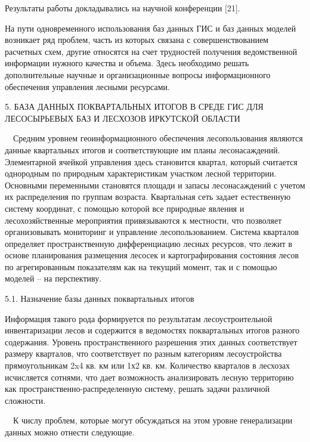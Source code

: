 \documentclass{report}
\begin{document}
Результаты работы докладывались на научной конференции [21].

На пути одновременного использования баз данных ГИС и баз данных моделей возникает ряд проблем, часть из которых связана
с совершенствованием расчетных схем, другие относятся на счет трудностей получения ведомственной информации нужного
качества и объема. Здесь необходимо решать дополнительные научные и организационные вопросы информационного обеспечения
управления лесными ресурсами.

5. БАЗА ДАННЫХ ПОКВАРТАЛЬНЫХ ИТОГОВ В СРЕДЕ ГИС ДЛЯ ЛЕСОСЫРЬЕВЫХ БАЗ И ЛЕСХОЗОВ ИРКУТСКОЙ ОБЛАСТИ

\ \ Средним уровнем геоинформационного обеспечения лесопользования являются данные квартальных итогов и соответствующие
им планы лесонасаждений.  Элементарной ячейкой управления здесь становится квартал, который считается однородным по
природным характеристикам участком лесной территории.  Основными переменными становятся площади и запасы лесонасаждений
с учетом их распределения по группам возраста. Квартальная сеть задает естественную систему координат, с помощью
которой все природные явления и лесохозяйственные мероприятия привязываются к местности, что позволяет организовывать
мониторинг и управление лесопользованием. Система кварталов определяет пространственную дифференциацию лесных ресурсов,
что лежит в основе планирования размещения  лесосек и картографирования состояния лесов по агрегированным показателям
как на текущий момент, так и с помощью моделей – на перспективу.  

5.1. Назначение базы данных поквартальных итогов

Информация такого рода формируется по результатам лесоустроительной инвентаризации лесов и содержится в ведомостях
поквартальных итогов разного содержания. Уровень пространственного разрешения  этих данных соответствует размеру
кварталов, что соответствует по разным категориям лесоустройства прямоугольникам 2x4 кв. км или 1х2 кв. км. Количество
кварталов в лесхозах исчисляется сотнями, что дает возможность анализировать лесную территорию как
пространственно-распределенную систему, решать задачи различной сложности. 

\ \ К числу проблем, которые могут обсуждаться на этом уровне генерализации данных можно отнести следующие. 
\end{document}
